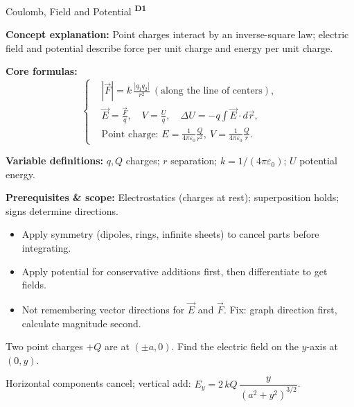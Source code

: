 ﻿\documentclass[12pt,a4paper]{article}
\providecommand{\KPFormulas}{}
\providecommand{\KPHeuristics}{}
\providecommand{\KPProblems}{}
\newcommand{\DOne}{\texorpdfstring{\textsuperscript{\textbf{D1}}}{ D1}}
\begin{document}

\begin{KnowledgePoint}{Coulomb, Field and Potential \DOne}
  \KPFormulas
  \begin{formulabox}
  \textbf{Concept explanation:} Point charges interact by an inverse-square law; electric field and potential describe force per unit charge and energy per unit charge.

  \textbf{Core formulas:}
  \[
  \left\{\begin{aligned}
    &|\vec F|=k\,\frac{|q_1 q_2|}{r^2}\ (\text{along the line of centers}),\\
    &\vec E=\frac{\vec F}{q},\quad V=\frac{U}{q},\quad \Delta U=-q\int \vec E\cdot d\vec r,\\
    &\text{Point charge: } E=\frac{1}{4\pi\varepsilon_0}\frac{Q}{r^2},\ V=\frac{1}{4\pi\varepsilon_0}\frac{Q}{r}.
  \end{aligned}\right.
  \]

  \textbf{Variable definitions:} $q,Q$ charges; $r$ separation; $k=1/(4\pi\varepsilon_0)$; $U$ potential energy.

  \textbf{Prerequisites \& scope:} Electrostatics (charges at rest); superposition holds; signs determine directions.
  \end{formulabox}

  \KPHeuristics
  \begin{heuristicsbox}
  \begin{itemize}[leftmargin=*]
    \item Apply symmetry (dipoles, rings, infinite sheets) to cancel parts before integrating.
    \item Apply potential for conservative additions first, then differentiate to get fields.
  \end{itemize}
  \vspace{0.4em}
  \begin{itemize}[leftmargin=*]
    \item Not remembering vector directions for $\vec E$ and $\vec F$. Fix: graph direction first, calculate magnitude second.
  \end{itemize}
  \end{heuristicsbox}

  \KPProblems
\begin{cheatproblem}
  Two point charges $+Q$ are at $(\pm a,0)$. Find the electric field on the $y$-axis at $(0,y)$.
  \begin{solutionbox}
  Horizontal components cancel; vertical add: $E_y=2\,kQ\,\dfrac{y}{(a^2+y^2)^{3/2}}$.
  \end{solutionbox}
  \end{cheatproblem}
\end{KnowledgePoint}
\end{document}
